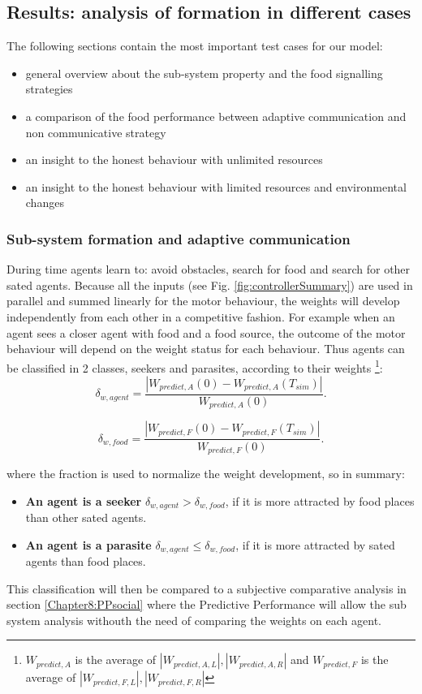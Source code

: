 \subsection{Results: analysis of formation in different cases}
The following sections contain the most important test cases for our model:
\begin{itemize}
\item general overview about the sub-system property and the food signalling strategies
\item a comparison of the food performance between adaptive communication and non communicative strategy
\item an insight to the honest behaviour with unlimited resources
\item an insight to the honest behaviour with limited resources and environmental changes
\end{itemize}

\subsubsection{Sub-system formation and adaptive communication}
During time agents learn to: avoid obstacles, search for food and search for
other sated agents.
Because all the inputs (see Fig. \ref{fig:controllerSummary}) are used in parallel
and summed linearly for the motor behaviour, the weights will develop independently
from each other in a competitive fashion.
For example when an agent sees a closer agent with food and a food source, the outcome
of the motor behaviour will depend on the weight status for each behaviour.
Thus agents can be classified in 2 classes, seekers and parasites,
according to their weights \footnote{$W_{predict,A}$ is the average
of $|W_{predict,A,L}|,|W_{predict,A,R}|$ and $W_{predict,F}$ is the average of $|W_{predict,F,L}|,|W_{predict,F,R}|$}:
\begin{equation}
\delta_{w,agent}=\frac{|W_{predict,A}(0)-W_{predict,A}(T_{sim})|}{W_{predict,A}(0)}.
\end{equation}

\begin{equation}
\delta_{w,food}=\frac{|W_{predict,F}(0)-W_{predict,F}(T_{sim})|}{W_{predict,F}(0)}.
\end{equation}

where the fraction is used to normalize the weight development, so in summary:
\begin{itemize}
 \item \textbf{An agent is a seeker} $\delta_{w,agent} > \delta_{w,food}$, if it is more
attracted by food places than other sated agents.
\item \textbf{An agent is a parasite} $\delta_{w,agent}\leq \delta_{w,food}$, if it is
more attracted by sated agents than food places.
\end{itemize}
This classification will then be compared to a subjective comparative analysis in
section \ref{Chapter8:PPsocial} where the Predictive Performance will allow the 
sub system analysis withouth the need of comparing the weights on each agent.

